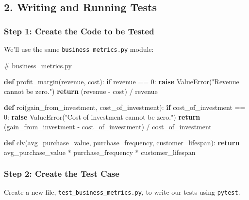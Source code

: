 \documentclass[
  letterpaper,
  DIV=11,
  numbers=noendperiod]{scrreprt}
\newenvironment{Shaded}{\begin{snugshade}}{\end{snugshade}}
\newcommand{\CommentTok}[1]{\textcolor[rgb]{0.37,0.37,0.37}{#1}}
\newcommand{\ControlFlowTok}[1]{\textcolor[rgb]{0.00,0.23,0.31}{\textbf{#1}}}
\newcommand{\DecValTok}[1]{\textcolor[rgb]{0.68,0.00,0.00}{#1}}
\newcommand{\KeywordTok}[1]{\textcolor[rgb]{0.00,0.23,0.31}{\textbf{#1}}}
\newcommand{\NormalTok}[1]{\textcolor[rgb]{0.00,0.23,0.31}{#1}}
\newcommand{\OperatorTok}[1]{\textcolor[rgb]{0.37,0.37,0.37}{#1}}
\newcommand{\PreprocessorTok}[1]{\textcolor[rgb]{0.68,0.00,0.00}{#1}}
\newcommand{\StringTok}[1]{\textcolor[rgb]{0.13,0.47,0.30}{#1}}
\begin{document}
\subsection{2. Writing and Running
Tests}\label{writing-and-running-tests-1}

\subsubsection{Step 1: Create the Code to be
Tested}\label{step-1-create-the-code-to-be-tested-1}

We'll use the same \texttt{business\_metrics.py} module:

\begin{Shaded}
\begin{Highlighting}[]
\CommentTok{\# business\_metrics.py}

\KeywordTok{def}\NormalTok{ profit\_margin(revenue, cost):}
    \ControlFlowTok{if}\NormalTok{ revenue }\OperatorTok{==} \DecValTok{0}\NormalTok{:}
        \ControlFlowTok{raise} \PreprocessorTok{ValueError}\NormalTok{(}\StringTok{"Revenue cannot be zero."}\NormalTok{)}
    \ControlFlowTok{return}\NormalTok{ (revenue }\OperatorTok{{-}}\NormalTok{ cost) }\OperatorTok{/}\NormalTok{ revenue}

\KeywordTok{def}\NormalTok{ roi(gain\_from\_investment, cost\_of\_investment):}
    \ControlFlowTok{if}\NormalTok{ cost\_of\_investment }\OperatorTok{==} \DecValTok{0}\NormalTok{:}
        \ControlFlowTok{raise} \PreprocessorTok{ValueError}\NormalTok{(}\StringTok{"Cost of investment cannot be zero."}\NormalTok{)}
    \ControlFlowTok{return}\NormalTok{ (gain\_from\_investment }\OperatorTok{{-}}\NormalTok{ cost\_of\_investment) }\OperatorTok{/}\NormalTok{ cost\_of\_investment}

\KeywordTok{def}\NormalTok{ clv(avg\_purchase\_value, purchase\_frequency, customer\_lifespan):}
    \ControlFlowTok{return}\NormalTok{ avg\_purchase\_value }\OperatorTok{*}\NormalTok{ purchase\_frequency }\OperatorTok{*}\NormalTok{ customer\_lifespan}
\end{Highlighting}
\end{Shaded}

\subsubsection{Step 2: Create the Test
Case}\label{step-2-create-the-test-case-1}

Create a new file, \texttt{test\_business\_metrics.py}, to write our
tests using \texttt{pytest}.
\end{document}
